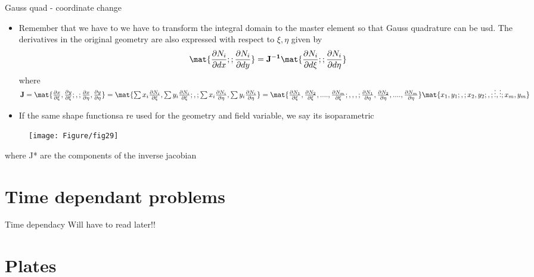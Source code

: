 	
	\begin{frame}{Gauss quad - coordinate change}
		\begin{itemize}
			\item Remember that we have to we have to transform the integral domain to the master element so that Gauss quadrature can be usd. The derivatives in the original geometry are also expressed with respect to $\xi,\eta$ given by
			\begin{equation}
			\mat{\frac{\partial N_i}{\partial dx}; ;\frac{\partial N_i}{\partial dy} } = \ve{J^{-1}} \mat{\frac{\partial N_i}{\partial d\xi}; ;\frac{\partial N_i}{\partial d\eta} } 
			\end{equation}
			where $\ve{J} = \mat{\frac{\partial x}{\partial \xi}, \frac{\partial y}{\partial \xi}; , ; \frac{\partial x}{\partial \eta}, \frac{\partial y}{\partial \eta}} =
			\mat {\sum x_i \frac{\partial N_i}{\partial \xi}, \sum y_i \frac{\partial N_i}{\partial \xi} ; , ; 
			\sum x_i \frac{\partial N_i}{\partial \eta}, \sum y_i \frac{\partial N_i}{\partial \eta}} = \mat{\frac{\partial N_1}{\partial \xi}, \frac{\partial N_2}{\partial \xi}, .... ,\frac{\partial N_m}{\partial \xi} ; , , ,;
			\frac{\partial N_1}{\partial \eta}, \frac{\partial N_2}{\partial \eta}, ...., \frac{\partial N_m}{\partial \eta} }
	 		\mat{x_1, y_1; , ; x_2, y_2; , ; \vdots, \vdots; x_m,y_m}$ 
	 		\item If the same shape functionsa re used for the geometry and field variable, we say its isoparametric
		\end{itemize}
	\end{frame}


	\begin{frame}
		\begin{figure}
			\centering
			\texttt{[image: Figure/fig29]} 		
		\end{figure} 
	where J* are the components of the inverse jacobian
	\end{frame}


	\section{Time dependant problems}
	
	\begin{frame}{Time dependacy}
		Will have to read later!!
	\end{frame}



\section{Plates}

